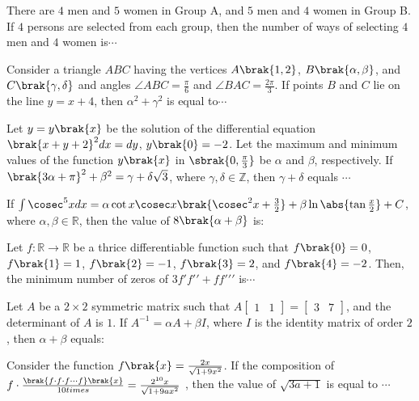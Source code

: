 \iffalse
\title{2024}
\author{AI24BTECH11006}
\section{integer}
\fi
    \item There are $4$ men and $5$ women in Group A, and $5$ men and $4$ women in Group B. If $4$ persons are selected from each group, then the number of ways of selecting $4$ men and $4$ women is$\cdots$
    \hfill{}

    \item Consider a triangle $ABC$ having the vertices $A\brak{1, 2}$, $B\brak{\alpha, \beta}$, and $C\brak{\gamma, \delta}$ and angles $\angle ABC = \frac{\pi}{6}$ and $\angle BAC = \frac{2\pi}{3}$. If points $B$ and $C$ lie on the line $y = x + 4$, then $\alpha^2 + \gamma^2$ is equal to$\cdots$
    \hfill{}

    \item Let $y = y\brak{x}$ be the solution of the differential equation $\brak{x + y + 2}^2  dx = dy$, $y\brak{0} = -2$. Let the maximum and minimum values of the function $y\brak{x}$ in $\sbrak{0, \frac{\pi}{3}}$ be $\alpha$ and $\beta$, respectively. If $\brak{3\alpha + \pi}^2 + \beta^2 = \gamma + \delta\sqrt{3}$, where $\gamma, \delta \in \mathbb{Z}$, then $\gamma + \delta$ equals $\cdots$
    \hfill{}
    \item If $\int \cosec^5 x dx = \alpha \cot x \cosec x\brak{\cosec^2 x +\frac{3}{2}} + \beta\ln\abs{ \tan \frac{x}{2}} + C$, where $\alpha, \beta \in \mathbb{R}$, then the value of $8\brak{\alpha + \beta}$ is:
    \hfill{}

    \item Let $f : \mathbb{R} \to \mathbb{R}$ be a thrice differentiable function such that $f\brak{0} = 0$, $f\brak{1} = 1$, $f\brak{2} = -1$, $f\brak{3} = 2$, and $f\brak{4} = -2$. Then, the minimum number of zeros of $3f\prime f\prime\prime+ff\prime\prime\prime$ is$\cdots$
    \hfill{}

    \item Let $A$ be a $2 \times 2$ symmetric matrix such that $A  \begin{bmatrix} 1 & 1 \end{bmatrix}=\begin{bmatrix} 3 & 7     \end{bmatrix}$, and the determinant of $A$ is $1$. If $A^{-1} = \alpha A + \beta I$, where $I$ is the identity matrix of order $2$, then $\alpha + \beta$ equals:
   \hfill{}
	    \item Consider the function $f\brak{x} = \frac{2x}{\sqrt{1 + 9x^2}}$. If the composition of $f\cdot\frac{\brak{f\cdot f \cdot f \cdots f}\brak{x}}{10 times}=\frac{2^{10}x}{\sqrt{1+9ax^2}}$ , then the value of $\sqrt{3a+1}$ is equal to $\cdots$
    \hfill{}

